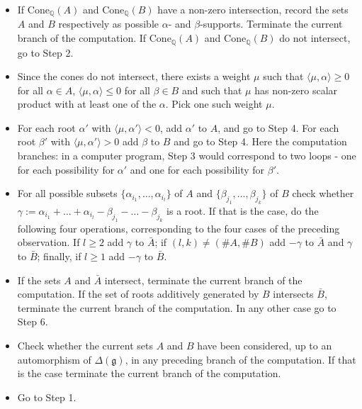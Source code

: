 \documentclass[12pt]{report}
\newcommand {\QQ} {\mathbb {Q}}
\newcommand{\gG}{\mathfrak{g}}
\newcommand{\refle}[1]{Lemma \ref{#1}}
\newcommand{\Cone}{\mathrm{Cone}}
\begin{document}
\begin{itemize}
\item[Step 1.] If $\Cone_{\QQ}(A)$ and $\Cone_{\QQ}(B)$ have a non-zero intersection, record the sets $A$ and $B$ respectively as possible $\alpha$- and $\beta$-supports. Terminate the current branch of the computation. If $\Cone_{\QQ}(A)$ and $\Cone_{\QQ}(B)$ do not intersect, go to Step 2.
\item[Step 2.] Since the cones do not intersect, there exists a weight $\mu$ such that $\langle\mu,\alpha\rangle\geq 0$ for all $\alpha\in A$, $\langle\mu,\alpha\rangle\leq 0$ for all $\beta\in B$ and such that $\mu$ has non-zero scalar product with at least one of the $\alpha$. Pick one such weight $\mu$.
\item[Step 3.] For each root $\alpha'$ with $\langle\mu,\alpha'\rangle<0$, add $\alpha'$ to $A$, and go to Step 4. For each root $\beta'$ with $\langle\mu,\alpha'\rangle>0$ add $\beta$ to $B$ and go to Step 4. Here the computation branches: in a computer program, Step 3 would correspond to two loops - one for each possibility for $\alpha'$ and one for each possibility for $\beta'$.
\item[Step 4.] For all possible subsets $\{\alpha_{i_1},\dots,\alpha_{i_l}\}$ of $A$ and $\{\beta_{j_1},\dots,\beta_{j_k}\}$ of $B$ check whether $\gamma:=\alpha_{i_1}+\dots +\alpha_{i_l}-\beta_{j_1}-\dots-\beta_{j_k}$ is a root. If that is the case, do the following four operations, corresponding to the four cases of the preceding observation. If $l\geq 2$ add $\gamma$ to $\bar A $; if $(l,k)\neq(\# A,\# B)$ add $-\gamma$ to  $\bar A$ and $\gamma$ to $\bar B$; finally, if $l\geq 1$ add $-\gamma$ to  $\bar B $.
\item[Step 5.] If the sets $A$ and $\bar A $ intersect, terminate the current branch of the computation. If the set of roots additively generated by $B$ intersects $\bar B $, terminate the current branch of the computation. In any other case go to Step 6.
\item[Step 6.] Check whether the current sets $A$ and $B$ have been considered, up to an automorphism of $\Delta(\gG)$, in any preceding branch of the computation. If that is the case terminate the current branch of the computation. %
\item[Step 7.] Go to Step 1.
\end{itemize}
\end{document}

